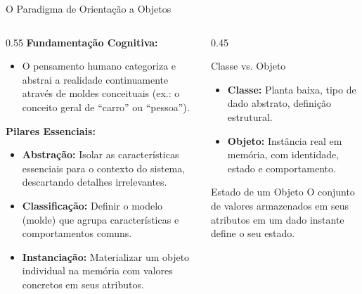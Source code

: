 \documentclass[10pt]{beamer}
\begin{document}
\begin{frame}{O Paradigma de Orientação a Objetos}
    \begin{columns}
        \begin{column}{0.55\textwidth}
            \textbf{Fundamentação Cognitiva:}
            \begin{itemize}
                \item O pensamento humano categoriza e abstrai a realidade continuamente através de moldes conceituais (ex.: o conceito geral de ``carro'' ou ``pessoa'').
            \end{itemize}
            \vspace{0.2cm}
            \textbf{Pilares Essenciais:}
            \begin{itemize}
                \item \textbf{Abstração:} Isolar as características essenciais para o contexto do sistema, descartando detalhes irrelevantes.
                \item \textbf{Classificação:} Definir o modelo (molde) que agrupa características e comportamentos comuns.
                \item \textbf{Instanciação:} Materializar um objeto individual na memória com valores concretos em seus atributos.
            \end{itemize}
        \end{column}
        \begin{column}{0.45\textwidth}
            \begin{block}{Classe vs. Objeto}
                \begin{itemize}
                    \item \textbf{Classe:} Planta baixa, tipo de dado abstrato, definição estrutural.
                    \item \textbf{Objeto:} Instância real em memória, com identidade, estado e comportamento.
                \end{itemize}
            \end{block}
            \vspace{0.2cm}
            \begin{alertblock}{Estado de um Objeto}
                O conjunto de valores armazenados em seus atributos em um dado instante define o seu estado.
            \end{alertblock}
        \end{column}
    \end{columns}
\end{frame}
\end{document}
